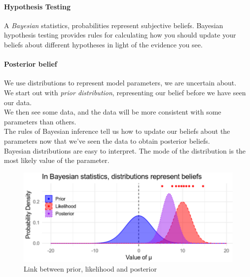 \paragraph{Hypothesis Testing}
A \emph{Bayesian} statistics, probabilities represent subjective beliefs. 
Bayesian hypothesis testing provides rules for calculating how you should update your 
beliefs about different hypotheses in light of the evidence you see.\\


\paragraph{Posterior belief}
We use distributions to represent model parameters, we are uncertain about.\\
We start out with \emph{prior distribution}, representing our belief before we have seen 
our data.\\
We then see some data, and the data will be more consistent with some parameters than 
others.\\
The rules of Bayesian inference tell us how to update our beliefs about the parameters now
that we've seen the data to obtain posterior beliefs.\\
Bayesian distributions are easy to interpret. The mode of the distribution is the most 
likely value of the parameter.
\begin{figure}[H]
	\begin{center}
		\includegraphics[width=\textwidth]{./chaps/10sec/images/2_posterior_belief.png}
	\end{center}
	\caption{Link between prior, likelihood and posterior}
	\label{fig:2_posterior_belief}
\end{figure}


